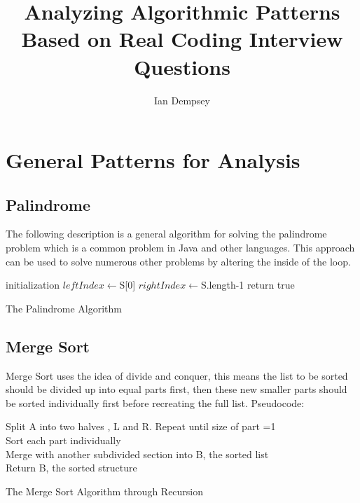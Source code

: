 \documentclass[10pt,twocolumn]{IEEEtran}
\title{Analyzing Algorithmic Patterns Based on Real Coding Interview Questions}
\author{Ian Dempsey}
\begin{document}
\maketitle
{}
\newpage
{}

\section{General Patterns for Analysis}
\subsection{Palindrome}
The following description is a general algorithm for solving the palindrome problem which is a common problem in Java and other languages. This approach can be used to solve numerous other problems by altering the inside of the loop.
\IncMargin{1em}
\begin{algorithm}
	\SetAlgoLined
	initialization\;
	$leftIndex  \longleftarrow $S[0]\;
	$rightIndex \longleftarrow $S.length-1\;
return true\;
\caption{The Palindrome Algorithm}
\end{algorithm}\DecMargin{1em}

\subsection{Merge Sort}
Merge Sort uses the idea of divide and conquer, this means the list to be sorted should be divided up into equal parts first, then these new smaller parts should be sorted individually first before recreating the full list.
Pseudocode:
\IncMargin{1em}
\begin{algorithm}
	\SetAlgoLined
  	{Split A into two halves , L and R. Repeat until size of part =1\\
  	Sort each part individually \\
  	Merge with another subdivided section into B, the sorted list\\ 
  	Return B, the sorted structure}
\caption{The Merge Sort Algorithm through Recursion}
\end{algorithm}\DecMargin{1em}
\end{document}
